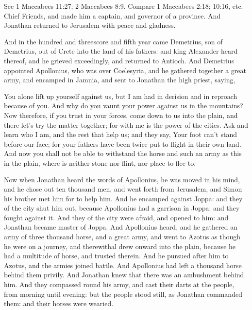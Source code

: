 {{See 1 Maccabees 11:27; 2 Maccabees 8:9. Compare 1 Maccabees 2:18; 10:16, etc.
} Chief Friends, and made him a captain, and governor of a province.
And Jonathan returned to Jerusalem with peace and gladness.
\par }{\PP {}And in
 the hundred and threescore and fifth year came Demetrius, son of Demetrius, out of Crete into the land of his fathers:
and king Alexander heard thereof, and he grieved exceedingly, and returned to Antioch.
And Demetrius appointed Apollonius, who was over Coelesyria, and he gathered together a great army, and encamped in Jamnia, and sent to Jonathan the high priest, saying,
\par }{\PP {}You alone lift up yourself against us, but I am had in derision and in reproach because of you. And why do you vaunt your power against us in the mountains?
Now therefore, if you trust in your forces, come down to us into the plain, and there let’s try the matter together; for with me is the power of the cities.
Ask and learn who I am, and the rest that help us; and they say, Your foot can’t stand before our face; for your fathers have been twice put to flight in their own land.
And now you shall not be able to withstand the horse and such an army as this in the plain, where is neither stone nor flint, nor place to flee to.
\par }{\PP {}Now when Jonathan heard the words of Apollonius, he was moved in his mind, and he chose out ten thousand men, and went forth from Jerusalem, and Simon his brother met him for to help him.
And he encamped against Joppa: and they of the city shut him out, because Apollonius had a garrison in Joppa:
and they fought against it. And they of the city were afraid, and opened to him: and Jonathan became master of Joppa.
And Apollonius heard, and he gathered an army of three thousand horse, and a great army, and went to Azotus as though he were on a journey, and therewithal drew onward into the plain, because he had a multitude of horse, and trusted therein.
And he pursued after him to Azotus, and the armies joined battle.
And Apollonius had left a thousand horse behind them privily.
And Jonathan knew that there was an ambushment behind him. And they compassed round his army, and cast their darts at the people, from morning until evening:
but the people stood still, as Jonathan commanded them: and their horses were wearied.
}
